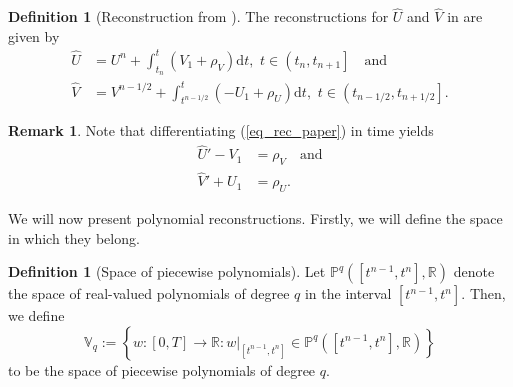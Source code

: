 \documentclass[12pt,a4paper]{article}
\numberwithin{equation}{section}
\theoremstyle{definition}
\newcommand{\polygs}[3]{\mathbb{P}^{#1}\qp{#2,#3}}
\newcommand{\qp}[1]{\left(#1\right)}
\newcommand{\qpb}[1]{\left(#1\right]}
\newcommand{\qb}[1]{\left[#1\right]}
\newcommand{\rec}[1]{\widehat{{#1}}}
\newcommand{\bracegs}[1]{\left\lbrace#1\right\rbrace}
\newtheorem{Defn}[subsection]{Definition}
\newtheorem{Rem}[subsection]{Remark}
\begin{document}
\begin{Defn}[Reconstruction from \cite{georgoulis2016posteriori}]\label{defn_rec_paper}
The reconstructions for $\rec{U}$ and $\rec{V}$ in \cite[\S3.1]{georgoulis2016posteriori} are given by 
\begin{equation}\label{eq_rec_paper}
\begin{aligned}
\hat{U}&=U^n +\int_{t_n}^{t}\left(V_1+\rho_V\right)\mathrm{d}t, \,\, t\in\qpb{t_n,t_{n+1}}\quad \text{and}\\
\hat{V}&=V^{n-1/2}+\int_{t^{n-1/2}}^{t}\left(-U_1+\rho_U\right)\mathrm{d}t, \,\, t\in\qpb{t_{n-1/2},t_{n+1/2}}.
\end{aligned}
\end{equation}
\end{Defn}
\begin{Rem}
	Note that differentiating (\ref{eq_rec_paper}) in time yields
	\begin{equation}\label{eq_model_recs}
	\begin{aligned}
	\rec{U}'-V_1&=\rho_V \quad\text{and}\\
	\rec{V}'+U_1&=\rho_U.
	\end{aligned}
	\end{equation}
\end{Rem}
We will now present polynomial reconstructions.  Firstly, we will define the space in which they belong. 
\begin{Defn}[Space of piecewise polynomials]\label{defn_space_pwpoly}
	Let $\polygs{q}{\qb{t^{n-1},t^n}}{\mathbb{R}}$ denote the space of real-valued polynomials of degree $q$ in the interval $\qb{t^{n-1}, t^n}$.  Then, we define 
	\begin{equation}
	\mathbb{V}_q:=\bracegs{w:\qb{0,T}\rightarrow\mathbb{R}: w|_{\qb{t^{n-1},t^n}}\in \polygs{q}{\qb{t^{n-1},t^n}}{\mathbb{R}}}
	\end{equation}
	to be the space of piecewise polynomials of degree $q$.
\end{Defn}
\end{document}
